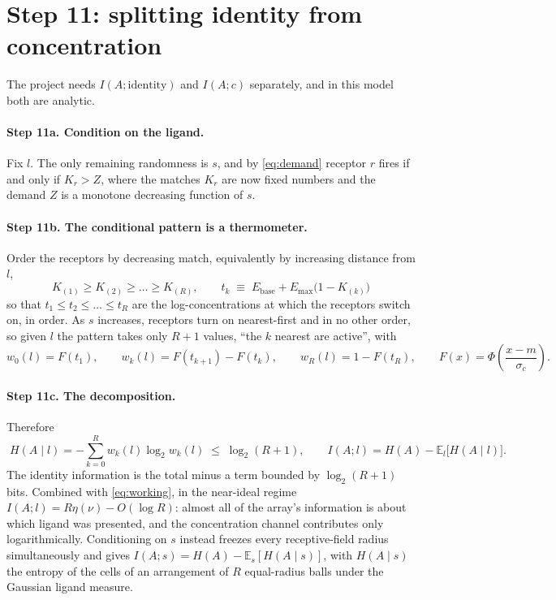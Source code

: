 \documentclass[11pt,a4paper]{article}
\newcommand{\EE}{\mathbb{E}}
\newcommand{\Ebase}{E_{\mathrm{base}}}
\newcommand{\Emax}{E_{\mathrm{max}}}
\begin{document}
\section{Step 11: splitting identity from concentration}
\label{sec:split}

The project needs $I(A;\text{identity})$ and $I(A;c)$ separately, and in this model both
are analytic.

\paragraph{Step 11a. Condition on the ligand.} Fix $l$. The only remaining randomness is
$s$, and by \eqref{eq:demand} receptor $r$ fires if and only if $K_r>Z$, where the
matches $K_r$ are now fixed numbers and the demand $Z$ is a monotone decreasing function
of $s$.

\paragraph{Step 11b. The conditional pattern is a thermometer.} Order the receptors by
decreasing match, equivalently by increasing distance from $l$,
\begin{equation}
  K_{(1)}\ge K_{(2)}\ge\dots\ge K_{(R)},
  \qquad
  t_k \;\equiv\; \Ebase+\Emax\big(1-K_{(k)}\big)
\end{equation}
so that $t_1\le t_2\le\dots\le t_R$ are the log-concentrations at which the receptors
switch on, in order. As $s$ increases, receptors turn on nearest-first and in no other
order, so given $l$ the pattern takes only $R+1$ values, ``the $k$ nearest are active'',
with
\begin{equation}
  w_0(l)=F(t_1),
  \qquad
  w_k(l)=F(t_{k+1})-F(t_k),
  \qquad
  w_R(l)=1-F(t_R),
  \qquad
  F(x)=\Phi\!\left(\frac{x-m}{\sigma_c}\right).
  \label{eq:thermo}
\end{equation}

\paragraph{Step 11c. The decomposition.} Therefore
\begin{equation}
  \boxed{\;H(A\mid l)=-\sum_{k=0}^{R}w_k(l)\log_2 w_k(l)\;\le\;\log_2(R+1),
  \qquad
  I(A;l)=H(A)-\EE_l\big[H(A\mid l)\big]. }
  \label{eq:split}
\end{equation}
The identity information is the total minus a term bounded by $\log_2(R+1)$ bits.
Combined with \eqref{eq:working}, in the near-ideal regime
$I(A;l)=R\eta(\nu)-O(\log R)$: almost all of the array's information is about which
ligand was presented, and the concentration channel contributes only logarithmically.
Conditioning on $s$ instead freezes every receptive-field radius simultaneously and
gives $I(A;s)=H(A)-\EE_s[H(A\mid s)]$, with $H(A\mid s)$ the entropy of the cells of an
arrangement of $R$ equal-radius balls under the Gaussian ligand measure.
\end{document}
